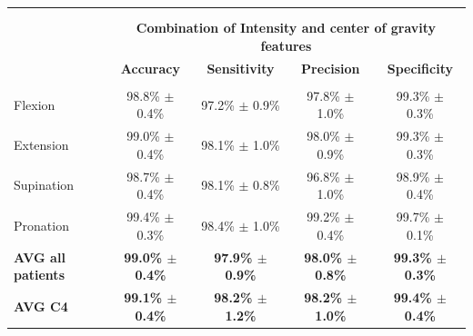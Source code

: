 \begin{table}[]
\begin{tabular}{lcccc}
                    &                                 &                               &                                    &                                       \\
                    &                                 &                               &                                    &                                       \\
                          & \multicolumn{4}{c}{\large{\textbf{Combination of Intensity and center of gravity features}}}                                                                                                                  \\
                          & \textbf{Accuracy}                               & \textbf{Sensitivity}                            & \textbf{Precision}                              & \textbf{Specificity}                            \\ \hline
                    &                                 &                               &                                    &                                       \\
Flexion                   & 98.8\% $\pm$ 0.4\%                              & 97.2\% $\pm$ 0.9\%                              & 97.8\% $\pm$ 1.0\%                              & 99.3\% $\pm$ 0.3\%                              \\
Extension                 & 99.0\% $\pm$ 0.4\%                              & 98.1\% $\pm$ 1.0\%                              & 98.0\% $\pm$ 0.9\%                              & 99.3\% $\pm$ 0.3\%                              \\
Supination                & 98.7\% $\pm$ 0.4\%                              & 98.1\% $\pm$ 0.8\%                              & 96.8\% $\pm$ 1.0\%                              & 98.9\% $\pm$ 0.4\%                              \\
Pronation                 & 99.4\% $\pm$ 0.3\%                              & 98.4\% $\pm$ 1.0\%                              & 99.2\% $\pm$ 0.4\%                              & 99.7\% $\pm$ 0.1\%                              \\ \hline \hline
\textbf{AVG all patients} & \textbf{99.0\% $\pm$ 0.4\%}                     & \textbf{97.9\% $\pm$ 0.9\%}                     & \textbf{98.0\% $\pm$ 0.8\%}                     & \textbf{99.3\% $\pm$ 0.3\%}                     \\
\textbf{AVG C4}           & \textbf{99.1\% $\pm$ 0.4\%}                     & \textbf{98.2\% $\pm$ 1.2\%}                     & \textbf{98.2\% $\pm$ 1.0\%}                     & \textbf{99.4\% $\pm$ 0.4\%}                    
\end{tabular}
\end{table}



